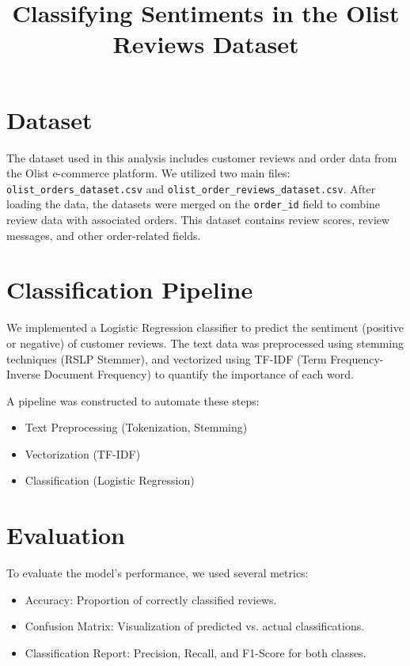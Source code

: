 \documentclass[conference]{IEEEtran}
\title{Classifying Sentiments in the Olist Reviews Dataset}
\begin{document}
\maketitle

\section{Dataset}
The dataset used in this analysis includes customer reviews and order data from the Olist e-commerce platform. 
We utilized two main files: \texttt{olist\_orders\_dataset.csv} and \texttt{olist\_order\_reviews\_dataset.csv}. 
After loading the data, the datasets were merged on the \texttt{order\_id} field to combine review data with associated orders. 
This dataset contains review scores, review messages, and other order-related fields.

\section{Classification Pipeline}
We implemented a Logistic Regression classifier to predict the sentiment (positive or negative) of customer reviews. 
The text data was preprocessed using stemming techniques (RSLP Stemmer), and vectorized using TF-IDF (Term Frequency-Inverse Document Frequency) to quantify the importance of each word.

A pipeline was constructed to automate these steps:
\begin{itemize}
    \item Text Preprocessing (Tokenization, Stemming)
    \item Vectorization (TF-IDF)
    \item Classification (Logistic Regression)
\end{itemize}

\section{Evaluation}
To evaluate the model's performance, we used several metrics:
\begin{itemize}
    \item Accuracy: Proportion of correctly classified reviews.
    \item Confusion Matrix: Visualization of predicted vs. actual classifications.
    \item Classification Report: Precision, Recall, and F1-Score for both classes.
\end{itemize}
\end{document}
